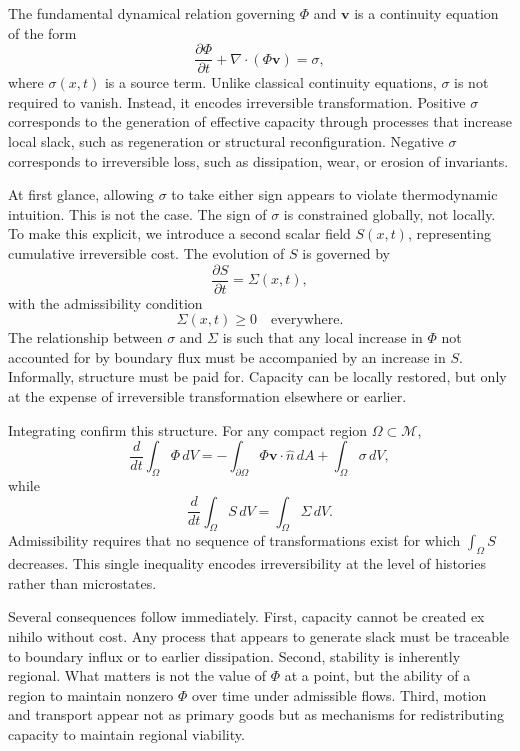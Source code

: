 \documentclass[12pt,oneside]{book}
\begin{document}
The fundamental dynamical relation governing \(\Phi\) and \(\mathbf{v}\) is a continuity equation of the form
\[
\frac{\partial \Phi}{\partial t} + \nabla \cdot (\Phi \mathbf{v}) = \sigma,
\]
where \(\sigma(x,t)\) is a source term. Unlike classical continuity equations, \(\sigma\) is not required to vanish. Instead, it encodes irreversible transformation. Positive \(\sigma\) corresponds to the generation of effective capacity through processes that increase local slack, such as regeneration or structural reconfiguration. Negative \(\sigma\) corresponds to irreversible loss, such as dissipation, wear, or erosion of invariants.

At first glance, allowing \(\sigma\) to take either sign appears to violate thermodynamic intuition. This is not the case. The sign of \(\sigma\) is constrained globally, not locally. To make this explicit, we introduce a second scalar field \(S(x,t)\), representing cumulative irreversible cost. The evolution of \(S\) is governed by
\[
\frac{\partial S}{\partial t} = \Sigma(x,t),
\]
with the admissibility condition
\[
\Sigma(x,t) \geq 0 \quad \text{everywhere}.
\]
The relationship between \(\sigma\) and \(\Sigma\) is such that any local increase in \(\Phi\) not accounted for by boundary flux must be accompanied by an increase in \(S\). Informally, structure must be paid for. Capacity can be locally restored, but only at the expense of irreversible transformation elsewhere or earlier.

Integrating confirm this structure. For any compact region \(\Omega \subset \mathcal{M}\),
\[
\frac{d}{dt} \int_{\Omega} \Phi \, dV
=
- \int_{\partial \Omega} \Phi \mathbf{v} \cdot \hat{n} \, dA
+ \int_{\Omega} \sigma \, dV,
\]
while
\[
\frac{d}{dt} \int_{\Omega} S \, dV
=
\int_{\Omega} \Sigma \, dV.
\]
Admissibility requires that no sequence of transformations exist for which \(\int_{\Omega} S\) decreases. This single inequality encodes irreversibility at the level of histories rather than microstates.

Several consequences follow immediately. First, capacity cannot be created ex nihilo without cost. Any process that appears to generate slack must be traceable to boundary influx or to earlier dissipation. Second, stability is inherently regional. What matters is not the value of \(\Phi\) at a point, but the ability of a region to maintain nonzero \(\Phi\) over time under admissible flows. Third, motion and transport appear not as primary goods but as mechanisms for redistributing capacity to maintain regional viability.
\end{document}
